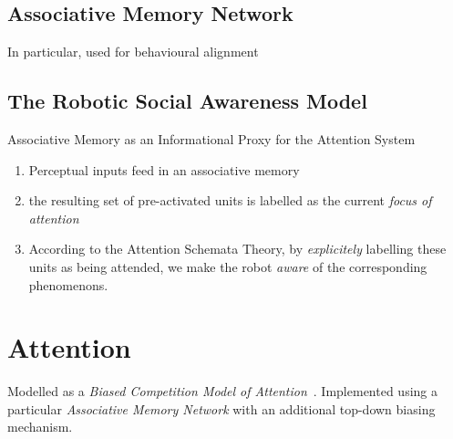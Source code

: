 \documentclass[a4paper]{article}
\begin{document}
\subsection{Associative Memory Network}


In particular, used for behavioural alignment

\subsection{The Robotic Social Awareness Model}

Associative Memory as an Informational Proxy for the Attention System


\begin{enumerate}
    \item Perceptual inputs feed in an associative memory
    \item the resulting set of pre-activated units is labelled as the current
        \emph{focus of attention}
    \item According to the Attention Schemata Theory, by \emph{explicitely}
        labelling these units as being attended, we make the robot \emph{aware}
        of the corresponding phenomenons.
\end{enumerate}

\section{Attention}

Modelled as a \emph{Biased Competition Model of
Attention}~\cite{desimone1995neural}.
Implemented using a particular \emph{Associative Memory Network} with an
additional top-down biasing mechanism.
\end{document}
